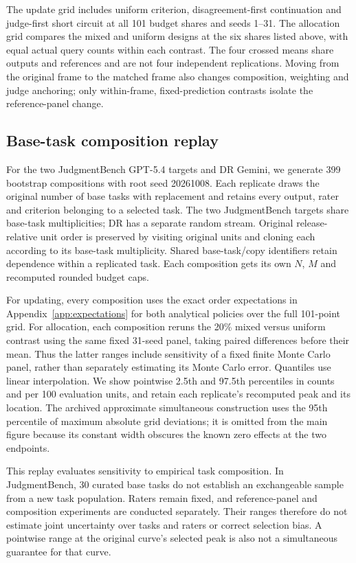 The update grid includes uniform criterion, disagreement-first continuation and
judge-first short circuit at all 101 budget shares and seeds 1--31. The
allocation grid compares the mixed and uniform designs at the six shares
listed above, with equal actual query counts within each contrast. The four
crossed means share outputs and references and are not four independent
replications. Moving from the original frame to the matched frame also
changes composition, weighting and judge anchoring; only within-frame,
fixed-prediction contrasts isolate the reference-panel change.

\subsection{Base-task composition replay}
\label{app:composition}

For the two JudgmentBench GPT-5.4 targets and DR Gemini, we generate 399
bootstrap compositions with root seed 20261008. Each replicate draws the
original number of base tasks with replacement and retains every output,
rater and criterion belonging to a selected task. The two JudgmentBench
targets share base-task multiplicities; DR has a separate random stream.
Original release-relative unit order is preserved by visiting original
units and cloning each according to its base-task multiplicity. Shared
base-task/copy identifiers retain dependence within a replicated task.
Each composition gets its own $N$, $M$ and recomputed rounded budget caps.

For updating, every composition uses the exact order expectations in
Appendix~\ref{app:expectations} for both analytical policies over the full
101-point grid. For allocation, each composition reruns the 20\% mixed versus
uniform contrast using the same fixed 31-seed panel, taking paired
differences before their mean. Thus the latter ranges include sensitivity
of a fixed finite Monte Carlo panel, rather than separately estimating its
Monte Carlo error. Quantiles use linear interpolation. We show pointwise
2.5th and 97.5th percentiles in counts and per 100 evaluation units, and
retain each replicate's recomputed peak and its location. The archived
approximate simultaneous construction uses the 95th percentile of maximum
absolute grid deviations; it is omitted from the main figure because its
constant width obscures the known zero effects at the two endpoints.

This replay evaluates sensitivity to empirical task composition. In
JudgmentBench, 30 curated base tasks do not establish an exchangeable sample
from a new task population. Raters remain fixed, and reference-panel and
composition experiments are conducted separately. Their ranges therefore
do not estimate joint uncertainty over tasks and raters or correct selection
bias. A pointwise range at the original curve's selected peak is also not a
simultaneous guarantee for that curve.


